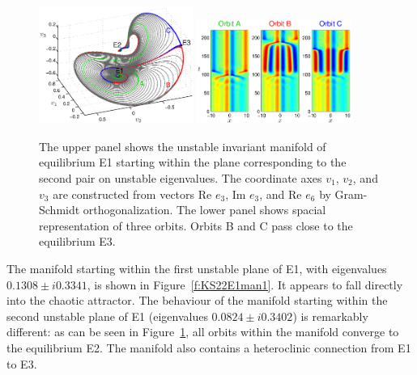 \begin{figure}[h]\vspace*{-5pt} \centering
\includegraphics[width=0.45\textwidth]{figs/ks22_E1_plane2_manifold.eps}
\includegraphics[width=0.45\textwidth]{figs/ks22_E1_plane2_orbits.eps}
\vspace*{-5pt}\caption{ {\small The upper panel shows the unstable
invariant manifold of equilibrium E1 starting within the plane
corresponding to the second pair on unstable eigenvalues. The
coordinate axes $v_1$, $v_2$, and $v_3$ are constructed from vectors
Re $e_3$, Im $e_3$, and Re $e_6$ by Gram-Schmidt orthogonalization.
The lower panel shows spacial representation of three orbits. Orbits
B and C pass close to the equilibrium E3.}}
\label{f:KS22E1man2}\vspace*{-5pt}
\end{figure}

The manifold starting within the first unstable plane of E1, with
eigenvalues $0.1308\pm i0.3341$, is shown in
Figure~\ref{f:KS22E1man1}. It appears to fall directly into the
chaotic attractor.  The behaviour of the manifold starting within
the second unstable plane of E1 (eigenvalues $0.0824\pm i0.3402$) is
remarkably different: as can be seen in Figure~\ref{f:KS22E1man2},
all orbits within the manifold converge to the equilibrium E2.  The
manifold also contains a heteroclinic connection from E1 to E3.

